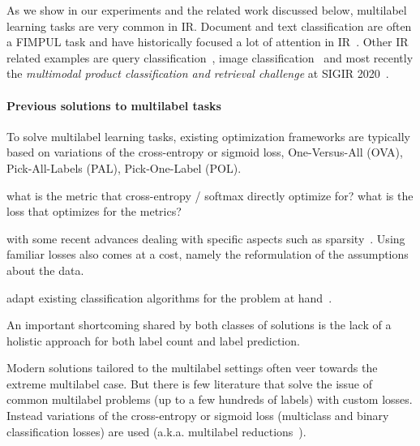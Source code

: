 
As we show in our experiments and the related work discussed below, multilabel learning tasks are very common in \ac{IR}. Document and text classification are often a FIMPUL task and have historically focused a lot of attention in \ac{IR}~\cite{IRClassStat, textCategorization, statTextCategorization, documentClassification}. Other \ac{IR} related examples are query classification~\cite{queryClassification, introIR}, image classification~\cite{imageClassification, faceDetection} and most recently the \textit{multimodal product classification and retrieval challenge} at SIGIR 2020~\cite{Amoualian2020SIGIR2E}. 

\paragraph{Previous solutions to multilabel tasks}
To solve multilabel learning tasks, existing optimization frameworks are typically based on variations of the cross-entropy or sigmoid loss, One-Versus-All (OVA), Pick-All-Labels (PAL), Pick-One-Label (POL).


what is the metric that cross-entropy / softmax directly optimize for? what is the loss that optimizes for the metrics?

with some recent advances dealing with specific aspects such as sparsity~\citep[see, e.g.,][]{focalLoss,tencent}.
Using familiar losses also comes at a cost, namely the reformulation of the assumptions about the data.  

adapt existing classification algorithms for the problem at hand~\citep{multilabelMethods}.

An important shortcoming shared by both classes of solutions is the lack of a holistic approach for both label count and label prediction.

Modern solutions tailored to the multilabel settings often veer towards the extreme multilabel case. But there is few literature that solve the issue of common multilabel problems (up to a few hundreds of labels) with custom losses. Instead variations of the cross-entropy or sigmoid loss (multiclass and binary classification losses) are used (a.k.a. multilabel reductions~\cite{multilabelReduction}).

